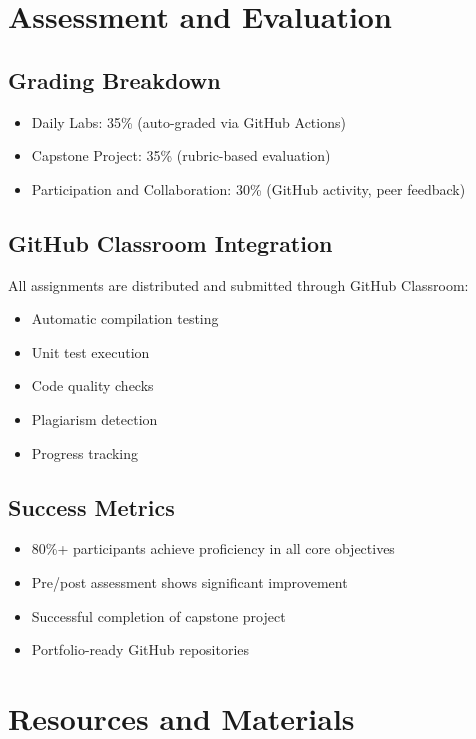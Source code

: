 \documentclass[11pt,a4paper]{article}
\begin{document}
\section{Assessment and Evaluation}

\subsection{Grading Breakdown}
\begin{itemize}
    \item Daily Labs: 35\% (auto-graded via GitHub Actions)
    \item Capstone Project: 35\% (rubric-based evaluation)
    \item Participation and Collaboration: 30\% (GitHub activity, peer feedback)
\end{itemize}

\subsection{GitHub Classroom Integration}
All assignments are distributed and submitted through GitHub Classroom:
\begin{itemize}
    \item Automatic compilation testing
    \item Unit test execution
    \item Code quality checks
    \item Plagiarism detection
    \item Progress tracking
\end{itemize}

\subsection{Success Metrics}
\begin{itemize}
    \item 80\%+ participants achieve proficiency in all core objectives
    \item Pre/post assessment shows significant improvement
    \item Successful completion of capstone project
    \item Portfolio-ready GitHub repositories
\end{itemize}

\section{Resources and Materials}
\end{document}
